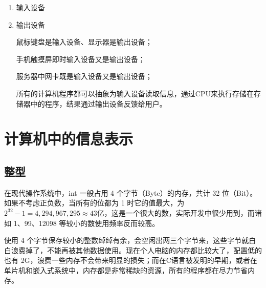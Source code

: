 \begin{enumerate}
\begin{itemize}
    内部存储器称为内存或者主存，是用来存放欲执行的程序和数据。

    在计算机内部，程序和数据都是以二进制代码的形式存储的，它们均以字节为单位（8位）存储在存储器中，一个字节占用一个存储单元，并且每个存储单元都有唯一的地址号。

    CPU可以直接使用指令对内部存储器按照地址进行读写俩种操作，读：将内存中某个存储单元的内容读出，送入CPU的某个寄存器中；写：在控制器的控制下，将CPU中某寄存器内容传到某个存储单元中。

    内存按工作方式的不同又可以分为俩部分：

    RAM：随机存储器，可以被CPU随机读取，一般存放CPU将要执行的程序、数据，断电丢失数据

    ROM：只读存储器，只能被CPU读，不能轻易被CPU写，用来存放永久性的程序和数据，比如：系统引导程序、监控程序等。具有掉电非易失性。
    \item 外部存储器
    
    外部存储器主要来存放”暂时“用不着的程序和数据，可以和内存交换数据。

    一般是磁盘、光盘、U盘、硬盘等。
  \end{itemize}
  \item 输入设备
  \item 输出设备
  
    鼠标键盘是输入设备、显示器是输出设备；

    手机触摸屏即时输入设备又是输出设备；

    服务器中网卡既是输入设备又是输出设备；

    所有的计算机程序都可以抽象为输入设备读取信息，通过CPU来执行存储在存储器中的程序，结果通过输出设备反馈给用户。
\end{enumerate}

\section{计算机中的信息表示}


\subsection{整型}

在现代操作系统中，int 一般占用 4 个字节（Byte）的内存，共计 32 位（Bit）。如果不考虑正负数，当所有的位都为 1 时它的值最大，为 $2^{32}-1 = 4,294,967,295 ≈ 43$亿，这是一个很大的数，实际开发中很少用到，而诸如 1、99、12098 等较小的数使用频率反而较高。

使用 4 个字节保存较小的整数绰绰有余，会空闲出两三个字节来，这些字节就白白浪费掉了，不能再被其他数据使用。现在个人电脑的内存都比较大了，配置低的也有 2G，浪费一些内存不会带来明显的损失；而在C语言被发明的早期，或者在单片机和嵌入式系统中，内存都是非常稀缺的资源，所有的程序都在尽力节省内存。

